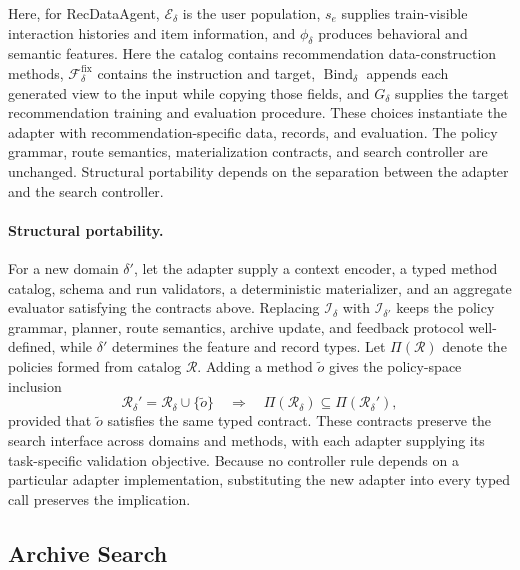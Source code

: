 Here, for RecDataAgent, $\mathcal{E}_{\delta}$ is the user population, $s_e$ supplies train-visible interaction histories and item information, and $\phi_{\delta}$ produces behavioral and semantic features.
Here the catalog contains recommendation data-construction methods, $\mathcal{F}_{\delta}^{\mathrm{fix}}$ contains the instruction and target, $\operatorname{Bind}_{\delta}$ appends each generated view to the input while copying those fields, and $G_{\delta}$ supplies the target recommendation training and evaluation procedure.
These choices instantiate the adapter with recommendation-specific data, records, and evaluation.
The policy grammar, route semantics, materialization contracts, and search controller are unchanged.
Structural portability depends on the separation between the adapter and the search controller.

\paragraph{Structural portability.}
For a new domain $\delta'$, let the adapter supply a context encoder, a typed method catalog, schema and run validators, a deterministic materializer, and an aggregate evaluator satisfying the contracts above.
Replacing $\mathcal{I}_{\delta}$ with $\mathcal{I}_{\delta'}$ keeps the policy grammar, planner, route semantics, archive update, and feedback protocol well-defined, while $\delta'$ determines the feature and record types.
Let $\Pi(\mathcal{R})$ denote the policies formed from catalog $\mathcal{R}$.
Adding a method $\tilde o$ gives the policy-space inclusion
\begin{equation}
 \mathcal{R}_{\delta}'=\mathcal{R}_{\delta}\cup\{\tilde o\}
 \quad\Longrightarrow\quad
 \Pi(\mathcal{R}_{\delta})\subseteq\Pi(\mathcal{R}_{\delta}'),
 \label{eq:method_extension}
\end{equation}
provided that $\tilde o$ satisfies the same typed contract.
These contracts preserve the search interface across domains and methods, with each adapter supplying its task-specific validation objective.
Because no controller rule depends on a particular adapter implementation, substituting the new adapter into every typed call preserves the implication.

\subsection{Archive Search}

